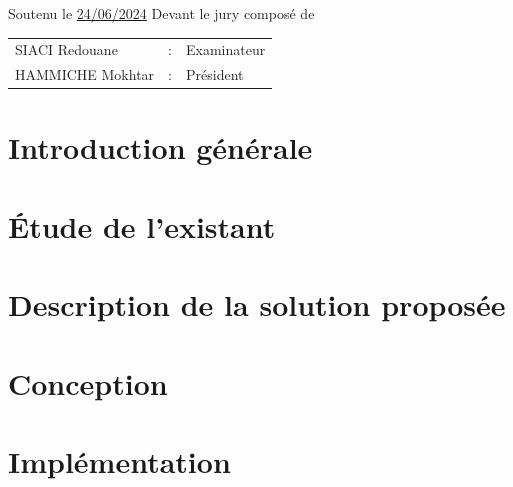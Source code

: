 \documentclass[12pt,a4paper]{report}
\begin{document}
\begin{titlepage}
\begin{center}
    {\normalsize Soutenu le \underline{24/06/2024} Devant le jury composé de} \\
    \vspace{0.4cm}
    \begin{tabular}{lll}
        SIACI Redouane & : & Examinateur \\
        HAMMICHE Mokhtar & : & Président \\
    \end{tabular}
\end{center}
\end{titlepage}





\tableofcontents
\listoffigures

\chapter*{Introduction générale}



\chapter{Étude de l'existant}


\chapter{Description de la solution proposée}



\chapter{Conception}



\chapter{Implémentation}

\end{document}
